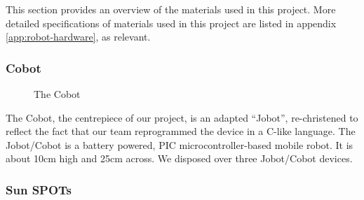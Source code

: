 \documentclass[a4paper,10pt]{article} %
\begin{document}
This section provides an overview of the materials used in this project. More
detailed specifications of materials used in this project are listed in appendix
\ref{app:robot-hardware}, as relevant.

\subsubsection{Cobot} %

\begin{figure}[h]
    \centering
    \caption{The Cobot}
    \label{fig:cobotviews}
\end{figure}


The Cobot, the centrepiece of our project, is an adapted ``Jobot'',
re-christened to reflect the fact that our team reprogrammed the device in a
C-like language. The Jobot/Cobot is a battery powered, PIC microcontroller-based
mobile robot. It is about 10cm high and 25cm across. We disposed over three
Jobot/Cobot devices.

\subsubsection{Sun SPOTs}
\end{document}
